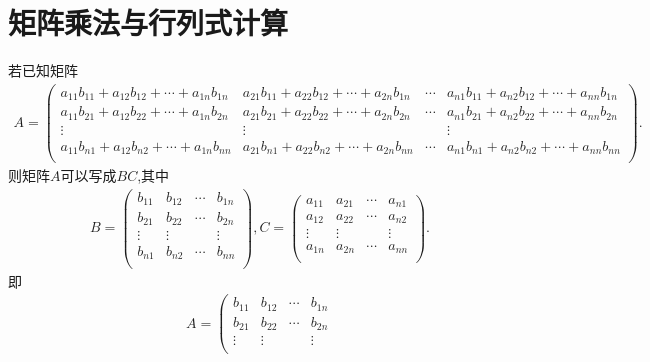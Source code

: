 \documentclass[../../main.tex]{subfiles}
\begin{document}
\section{矩阵乘法与行列式计算}

\begin{proposition}\label{proposition:可以写成两个矩阵(向量)乘积的矩阵}
若已知矩阵\begin{align*}
A=\left( \begin{matrix}
a_{11}b_{11}+a_{12}b_{12}+\cdots +a_{1n}b_{1n}&		a_{21}b_{11}+a_{22}b_{12}+\cdots +a_{2n}b_{1n}&		\cdots&		a_{n1}b_{11}+a_{n2}b_{12}+\cdots +a_{nn}b_{1n}\\
a_{11}b_{21}+a_{12}b_{22}+\cdots +a_{1n}b_{2n}&		a_{21}b_{21}+a_{22}b_{22}+\cdots +a_{2n}b_{2n}&		\cdots&		a_{n1}b_{21}+a_{n2}b_{22}+\cdots +a_{nn}b_{2n}\\
\vdots&		\vdots&		&		\vdots\\
a_{11}b_{n1}+a_{12}b_{n2}+\cdots +a_{1n}b_{nn}&		a_{21}b_{n1}+a_{22}b_{n2}+\cdots +a_{2n}b_{nn}&		\cdots&		a_{n1}b_{n1}+a_{n2}b_{n2}+\cdots +a_{nn}b_{nn}\\
\end{matrix} \right) .
\end{align*}
则矩阵$A$可以写成$BC$,其中
\begin{align*}
B=\left( \begin{matrix}
b_{11}&		b_{12}&		\cdots&		b_{1n}\\
b_{21}&		b_{22}&		\cdots&		b_{2n}\\
\vdots&		\vdots&		&		\vdots\\
b_{n1}&		b_{n2}&		\cdots&		b_{nn}\\
\end{matrix} \right),
C=\left( \begin{matrix}
a_{11}&		a_{21}&		\cdots&		a_{n1}\\
a_{12}&		a_{22}&		\cdots&		a_{n2}\\
\vdots&		\vdots&		&		\vdots\\
a_{1n}&		a_{2n}&		\cdots&		a_{nn}\\
\end{matrix} \right) .
\end{align*}
即\begin{align*}
A=\left( \begin{matrix}
b_{11}&		b_{12}&		\cdots&		b_{1n}\\
b_{21}&		b_{22}&		\cdots&		b_{2n}\\
\vdots&		\vdots&		&		\vdots\\

\end{matrix}
\end{align*}
\end{proposition}
\end{document}
